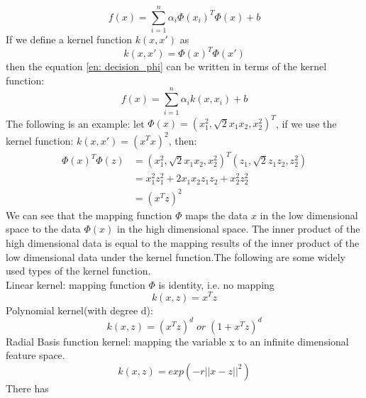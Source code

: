 \begin{equation}\label{en: decision_phi}
f(x) =\sum_{i=1}^{n} \alpha_i\Phi(x_i)^T\Phi(x)+b
\end{equation} 
If we define a kernel function $k(x, x')$ as
\begin{equation}\label{kernel}
k(x, x')=\Phi(x)^T\Phi(x')
\end{equation}
then the equation \ref{en: decision_phi} can be written in terms of the kernel function: 
\begin{equation}\label{decision_kernal}
f(x)=\sum_{i=1}^{n}\alpha_ik(x, x_i)+b
\end{equation}
The following is an example:  let $\Phi(x)=(x_1^2, \sqrt{2}x_1x_2, x_2^2)^T$,  if we use the kernel function:  $k(x, x')=(x^Tx)^2$, then: 
\begin{equation*}
\begin{aligned}
\Phi(x)^T\Phi(z)&=(x_1^2, \sqrt{2}x_1x_2, x_2^2)^T(z_1, \sqrt{2}z_1z_2, z_2^2)\\
&=x_1^2z_1^2+2x_1x_2z_1z_2+x_2^2z_2^2\\
&=(x^Tz)^2
\end{aligned}
\end{equation*}
We can see that the mapping function $\Phi$ maps the data $x$ in the low dimensional space to the data $\Phi(x)$ in the high dimensional space. The inner product of the high dimensional data is equal to the mapping results of the inner product of the low dimensional data under the kernel function.The following are some widely used types of the kernel function.\\
Linear kernel:  mapping function $\Phi$ is identity, i.e. no mapping
\begin{equation}
k(x, z)=x^Tz
\end{equation}
Polynomial kernel(with degree d): 
\begin{equation}
k(x, z)=(x^Tz)^d\;or\;(1+x^Tz)^d
\end{equation}
Radial Basis function kernel: mapping the variable x to an infinite dimensional feature space.
\begin{equation}
k(x, z)=exp(-r||x-z||^2)
\end{equation}
There has 

